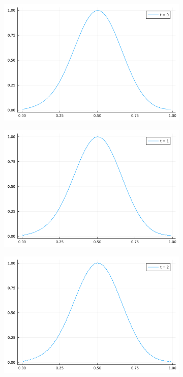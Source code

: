 \documentclass[12pt]{report}
\begin{document}
\begin{solution}
    \begin{figure}[H] \label{fig:3}
      \centering
      \begin{subfigure}{0.495\linewidth}
        \centering
        \includegraphics[width=\linewidth]{images/3-1.png}
      \end{subfigure}
      \begin{subfigure}{0.495\linewidth}
        \centering
        \includegraphics[width=\linewidth]{images/3-2.png}
      \end{subfigure}
      \begin{subfigure}{0.495\linewidth}
        \centering
        \includegraphics[width=\linewidth]{images/3-3.png}

\end{subfigure}
\end{figure}
\end{solution}
\end{document}
